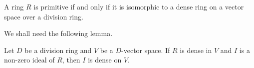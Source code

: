 %
%
%
%


\begin{theorem}[Jacobson]
	\label{thm:density}
	A ring $R$ is primitive if and only if it is isomorphic to a dense ring on 
	a vector space over a division ring.
\end{theorem}

We shall need the following lemma. 

\begin{lemma}
	\label{lem:ideal_denso}
	Let $D$ be a division ring and $V$ be a $D$-vector space. 
	If $R$ is dense in $V$ and $I$ is a non-zero ideal of $R$, then 
	$I$ is dense on $V$. 
\end{lemma}

